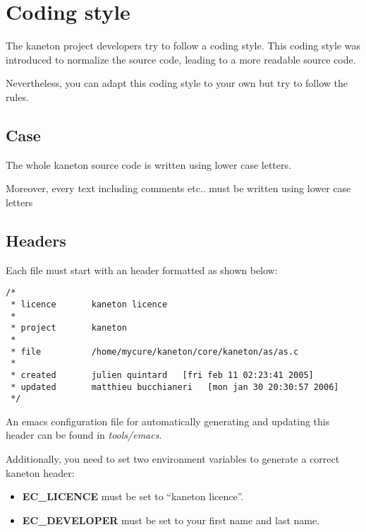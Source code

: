 
%
%

\chapter{Coding style}

The kaneton project developers try to follow a coding style. This
coding style was introduced to normalize the source code, leading to a
more readable source code.

Nevertheless, you can adapt this coding style to your own but try to
follow the rules.

%
%

\section{Case}

The whole kaneton source code is written using lower case letters.

Moreover, every text including comments etc.. must be written using
lower case letters

%
%

\section{Headers}

Each file must start with an header formatted as shown below:

\begin{verbatim}
/*
 * licence       kaneton licence
 *
 * project       kaneton
 *
 * file          /home/mycure/kaneton/core/kaneton/as/as.c
 *
 * created       julien quintard   [fri feb 11 02:23:41 2005]
 * updated       matthieu bucchianeri   [mon jan 30 20:30:57 2006]
 */
\end{verbatim}

An emacs configuration file for automatically generating and updating
this header can be found in \textit{tools/emacs}.

Additionally, you need to set two environment variables to generate
a correct kaneton header:

\begin{itemize}
  \item
    \textbf{EC\_LICENCE} must be set to ``kaneton licence''.
  \item
    \textbf{EC\_DEVELOPER} must be set to your first name and last name.
\end{itemize}

